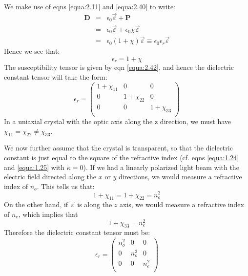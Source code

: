 \documentclass[12pt]{book}
\begin{document}
\begin{Answer}
  We make use of eqns \ref{equa:2.11} and \ref{equa:2.40} to write:
  \begin{eqnarray}
\nonumber   \mathbf{D} &=& \epsilon_0\vec{\varepsilon}+\mathbf{P} \\
\nonumber     &=&      \epsilon_0\vec{\varepsilon}+\epsilon_0\chi\vec{\varepsilon} \\
     &=& \epsilon_0(1+\chi)\vec{\varepsilon}\equiv\epsilon_0\epsilon_r\vec{\varepsilon} \label{equa:2.43}
  \end{eqnarray}
  Hence we see that:
  \begin{equation}\label{equa:2.44}
    \epsilon_r=1+\chi
  \end{equation}
  The susceptibility tensor is given by eqn \ref{equa:2.42}, and hence the dielectric constant tensor will take the form:
\begin{equation}\label{equa:2.45}
  \epsilon_r=\left(
    \begin{array}{ccc}
      1+\chi_{11} & 0 & 0 \\
      0 & 1+\chi_{22} & 0 \\
      0 & 0 & 1+\chi_{33} \\
    \end{array}
  \right)
\end{equation}
In a uniaxial crystal with the optic axis along the z direction, we must have $\chi_{11}=\chi_{22}\ne\chi_{33}$.

We now further assume that the crystal is transparent, so that the dielectric constant is just equal to the square of the refractive index (cf. eqns \ref{equa:1.24} and \ref{equa:1.25} with $\kappa=0$). If we had a linearly polarized light beam with the electric field directed along the $x$ or $y$ directions, we would measure a refractive index of $n_o$. This tells us that:
\begin{equation*}
  1+\chi_{11}=1+\chi_{22}=n_o^2
\end{equation*}
On the other hand, if $\vec{\varepsilon}$ is along the $z$ axis, we would measure a refractive index of $n_e$, which implies that
\begin{equation*}
  1+\chi_{33}=n_e^2
\end{equation*}
Therefore the dielectric constant tensor must be:
\begin{equation}\label{equa:2.46}
  \epsilon_r=\left(
               \begin{array}{ccc}
                 n_o^2 & 0 & 0 \\
                 0 & n_o^2 & 0 \\
                 0 & 0 & n_e^2 \\
               \end{array}
             \right)
\end{equation}
\end{Answer}
\end{document}
